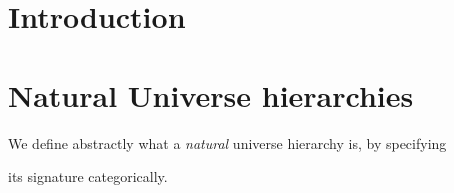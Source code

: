 \documentclass{article}
\begin{document}
\begin{abstract}
    
\end{abstract}

\section{Introduction}

\section{Natural Universe hierarchies}

We define abstractly what a \textit{natural} universe hierarchy is, by specifying

its signature categorically.
\end{document}
